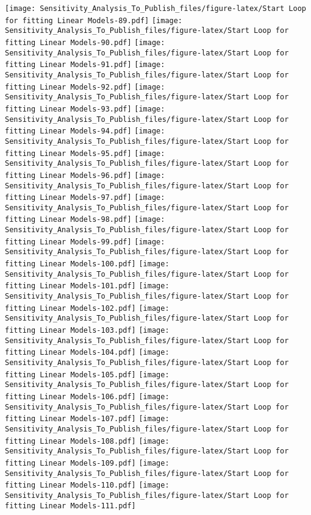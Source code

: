 \documentclass[
]{article}
\begin{document}
\texttt{[image: Sensitivity\_Analysis\_To\_Publish\_files/figure-latex/Start Loop for fitting Linear Models-89.pdf]}
\texttt{[image: Sensitivity\_Analysis\_To\_Publish\_files/figure-latex/Start Loop for fitting Linear Models-90.pdf]}
\texttt{[image: Sensitivity\_Analysis\_To\_Publish\_files/figure-latex/Start Loop for fitting Linear Models-91.pdf]}
\texttt{[image: Sensitivity\_Analysis\_To\_Publish\_files/figure-latex/Start Loop for fitting Linear Models-92.pdf]}
\texttt{[image: Sensitivity\_Analysis\_To\_Publish\_files/figure-latex/Start Loop for fitting Linear Models-93.pdf]}
\texttt{[image: Sensitivity\_Analysis\_To\_Publish\_files/figure-latex/Start Loop for fitting Linear Models-94.pdf]}
\texttt{[image: Sensitivity\_Analysis\_To\_Publish\_files/figure-latex/Start Loop for fitting Linear Models-95.pdf]}
\texttt{[image: Sensitivity\_Analysis\_To\_Publish\_files/figure-latex/Start Loop for fitting Linear Models-96.pdf]}
\texttt{[image: Sensitivity\_Analysis\_To\_Publish\_files/figure-latex/Start Loop for fitting Linear Models-97.pdf]}
\texttt{[image: Sensitivity\_Analysis\_To\_Publish\_files/figure-latex/Start Loop for fitting Linear Models-98.pdf]}
\texttt{[image: Sensitivity\_Analysis\_To\_Publish\_files/figure-latex/Start Loop for fitting Linear Models-99.pdf]}
\texttt{[image: Sensitivity\_Analysis\_To\_Publish\_files/figure-latex/Start Loop for fitting Linear Models-100.pdf]}
\texttt{[image: Sensitivity\_Analysis\_To\_Publish\_files/figure-latex/Start Loop for fitting Linear Models-101.pdf]}
\texttt{[image: Sensitivity\_Analysis\_To\_Publish\_files/figure-latex/Start Loop for fitting Linear Models-102.pdf]}
\texttt{[image: Sensitivity\_Analysis\_To\_Publish\_files/figure-latex/Start Loop for fitting Linear Models-103.pdf]}
\texttt{[image: Sensitivity\_Analysis\_To\_Publish\_files/figure-latex/Start Loop for fitting Linear Models-104.pdf]}
\texttt{[image: Sensitivity\_Analysis\_To\_Publish\_files/figure-latex/Start Loop for fitting Linear Models-105.pdf]}
\texttt{[image: Sensitivity\_Analysis\_To\_Publish\_files/figure-latex/Start Loop for fitting Linear Models-106.pdf]}
\texttt{[image: Sensitivity\_Analysis\_To\_Publish\_files/figure-latex/Start Loop for fitting Linear Models-107.pdf]}
\texttt{[image: Sensitivity\_Analysis\_To\_Publish\_files/figure-latex/Start Loop for fitting Linear Models-108.pdf]}
\texttt{[image: Sensitivity\_Analysis\_To\_Publish\_files/figure-latex/Start Loop for fitting Linear Models-109.pdf]}
\texttt{[image: Sensitivity\_Analysis\_To\_Publish\_files/figure-latex/Start Loop for fitting Linear Models-110.pdf]}
\texttt{[image: Sensitivity\_Analysis\_To\_Publish\_files/figure-latex/Start Loop for fitting Linear Models-111.pdf]}
\end{document}
